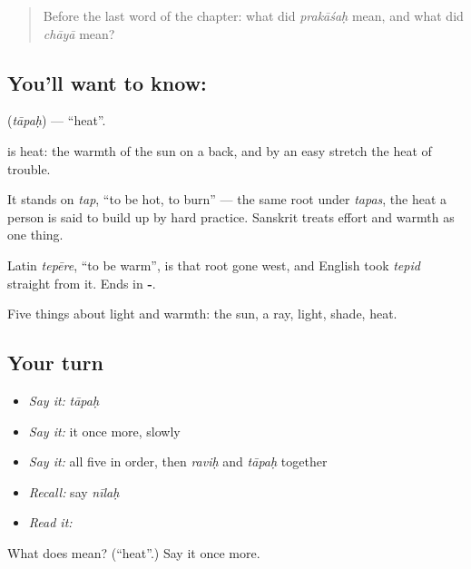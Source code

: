 \label{lesson:SA-C46-heat}



\begin{quote}
Before the last word of the chapter: what did \emph{prakāśaḥ} mean, and what did \emph{chāyā} mean?
\end{quote}

\subsection*{You'll want to know: }
\textbf{} (\emph{tāpaḥ}) — \textquotedblleft{}heat\textquotedblright{}.

\textbf{} is heat: the warmth of the sun on a back, and by an easy stretch the heat of trouble.

It stands on \emph{tap}, \textquotedblleft{}to be hot, to burn\textquotedblright{} — the same root under \emph{tapas}, the heat a person is said to build up by hard practice. Sanskrit treats effort and warmth as one thing.

Latin \emph{tepēre}, \textquotedblleft{}to be warm\textquotedblright{}, is that root gone west, and English took \emph{tepid} straight from it. Ends in \textbf{-}.

\begin{grammarlens}[title={What you've built}]
Five things about light and warmth: the sun, a ray, light, shade, heat.
\end{grammarlens}

\subsection*{Your turn}
\begin{itemize}
\raggedright
  \item \emph{Say it:} \emph{tāpaḥ}
  \item \emph{Say it:} it once more, slowly
  \item \emph{Say it:} all five in order, then \emph{raviḥ} and \emph{tāpaḥ} together
  \item \emph{Recall:} say \emph{nīlaḥ}
  \item \emph{Read it:} \textbf{}
\end{itemize}

\begin{tcolorbox}[breakable,colback=teal!4,colframe=teal!35!black,title={Before you move on}]
What does  mean? (\textquotedblleft{}heat\textquotedblright{}.) Say it once more.
\end{tcolorbox}
